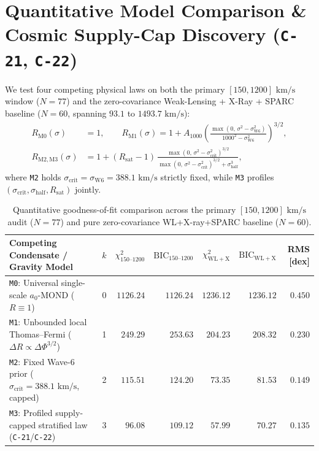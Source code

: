 \documentclass[11pt,a4paper]{article}
\begin{document}
\section{Quantitative Model Comparison \& Cosmic Supply-Cap Discovery (\texttt{C-21}, \texttt{C-22})}

We test four competing physical laws on both the primary $[150, 1200]\text{ km/s}$ window ($N=77$) and the zero-covariance Weak-Lensing + X-Ray + SPARC baseline ($N=60$, spanning $93.1$ to $1493.7\text{ km/s}$):
\begin{equation}
\begin{aligned}
  R_{\mathrm{M0}}(\sigma) &= 1, \qquad
  R_{\mathrm{M1}}(\sigma) = 1 + A_{1000}\left(\frac{\max(0,\,\sigma^2 - \sigma_{\mathrm{W6}}^2)}{1000^2 - \sigma_{\mathrm{W6}}^2}\right)^{3/2}, \\
  R_{\mathrm{M2,M3}}(\sigma) &= 1 + (R_{\mathrm{sat}} - 1)\,\frac{\max(0,\,\sigma^2 - \sigma_{\mathrm{crit}}^2)^{3/2}}{\max(0,\,\sigma^2 - \sigma_{\mathrm{crit}}^2)^{3/2} + \sigma_{\mathrm{half}}^3},
\end{aligned}
\end{equation}
where \texttt{M2} holds $\sigma_{\mathrm{crit}} = \sigma_{\mathrm{W6}} = 388.1\text{ km/s}$ strictly fixed, while \texttt{M3} profiles $(\sigma_{\mathrm{crit}}, \sigma_{\mathrm{half}}, R_{\mathrm{sat}})$ jointly.

\begin{table}[!htbp]
\centering
\caption{Quantitative goodness-of-fit comparison across the primary $[150, 1200]\text{ km/s}$ audit ($N=77$) and pure zero-covariance WL+X-ray+SPARC baseline ($N=60$).}
\label{tab:models}
\vspace{3pt}
\begin{tabularx}{\linewidth}{Xrrrrrr}
\toprule
\textbf{Competing Condensate / Gravity Model} & \textbf{$k$} & \textbf{$\chi^2_{150\text{--}1200}$} & \textbf{$\mathrm{BIC}_{150\text{--}1200}$} & \textbf{$\chi^2_{\mathrm{WL+X}}$} & \textbf{$\mathrm{BIC}_{\mathrm{WL+X}}$} & \textbf{RMS [dex]} \\
\midrule
\texttt{M0}: Universal single-scale $a_0$-MOND ($R \equiv 1$) & 0 & $1126.24$ & $1126.24$ & $1236.12$ & $1236.12$ & $0.450$ \\
\texttt{M1}: Unbounded local Thomas--Fermi ($\Delta R \propto \Delta\Phi^{3/2}$) & 1 & $249.29$ & $253.63$ & $204.23$ & $208.32$ & $0.230$ \\
\texttt{M2}: Fixed Wave-6 prior ($\sigma_{\mathrm{crit}} = 388.1\text{ km/s}$, capped) & 2 & $115.51$ & $124.20$ & $73.35$ & $81.53$ & $0.149$ \\
\texttt{M3}: Profiled supply-capped stratified law (\texttt{C-21}/\texttt{C-22}) & 3 & $\mathbf{96.08}$ & $\mathbf{109.12}$ & $\mathbf{57.99}$ & $\mathbf{70.27}$ & $\mathbf{0.135}$ \\
\bottomrule
\end{tabularx}
\end{table}
\end{document}
